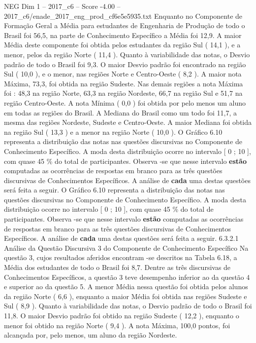 \begin{textsample}{NEG Dim 1 – 2017\_c6 – Score -4.00 – 2017\_c6/enade\_2017\_eng\_prod\_cf6e5e5935.txt}
Enquanto no Componente de Formação Geral a Média para estudantes de Engenharia de Produção de todo o Brasil foi 56,5, na parte de Conhecimento Específico a Média foi 12,9.
A maior Média deste componente foi obtida pelos estudantes da região Sul ( 14,1 ), e a menor, pelos da região Norte ( 11,4 ).
Quanto à variabilidade das notas, o Desvio padrão de todo o Brasil foi 9,3.
O maior Desvio padrão foi encontrado na região Sul ( 10,0 ), e o menor, nas regiões Norte e Centro-Oeste ( 8,2 ).
A maior nota Máxima, 73,3, foi obtida na região Sudeste.
Nas demais regiões a nota Máxima foi : 48,3 na região Norte, 63,3 na região Nordeste, 66,7 na região Sul e 51,7 na região Centro-Oeste.
A nota Mínima ( 0,0 ) foi obtida por pelo menos um aluno em todas as regiões do Brasil.
A Mediana do Brasil como um todo foi 11,7, a mesma das regiões Nordeste, Sudeste e Centro-Oeste.
A maior Mediana foi obtida na região Sul ( 13,3 ) e a menor na região Norte ( 10,0 ).
O Gráfico 6.10 representa a distribuição das notas nas questões discursivas no Componente de Conhecimento Específico.
A moda desta distribuição ocorre no intervalo [ 0 ; 10 ], com quase 45 \% do total de participantes.
Observa -se que nesse intervalo \textbf{estão} computadas as ocorrências de respostas em branco para as três questões discursivas de Conhecimentos Específicos.
A análise de \textbf{cada} uma destas questões será feita a seguir.
O Gráfico 6.10 representa a distribuição das notas nas questões discursivas no Componente de Conhecimento Específico.
A moda desta distribuição ocorre no intervalo [ 0 ; 10 ], com quase 45 \% do total de participantes.
Observa -se que nesse intervalo \textbf{estão} computadas as ocorrências de respostas em branco para as três questões discursivas de Conhecimentos Específicos.
A análise de \textbf{cada} uma destas questões será feita a seguir. 6.3.2.1 Análise da Questão Discursiva 3 do Componente de Conhecimento Específico Na questão 3, cujos resultados aferidos encontram -se descritos na Tabela 6.18, a Média dos estudantes de todo o Brasil foi 8,7.
Dentre as três discursivas de Conhecimentos Específicos, a questão 3 teve desempenho inferior ao da questão 4 e superior ao da questão 5.
A menor Média nessa questão foi obtida pelos alunos da região Norte ( 6,6 ), enquanto a maior Média foi obtida nas regiões Sudeste e Sul ( 8,9 ).
Quanto à variabilidade das notas, o Desvio padrão de todo o Brasil foi 11,8.
O maior Desvio padrão foi obtido na região Sudeste ( 12,2 ), enquanto o menor foi obtido na região Norte ( 9,4 ).
A nota Máxima, 100,0 pontos, foi alcançada por, pelo menos, um aluno da região Nordeste.

\end{textsample}
